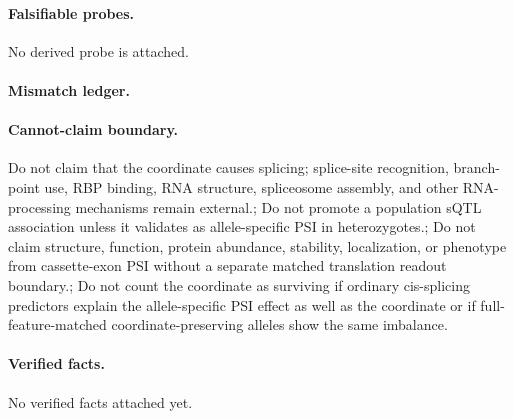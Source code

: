 \paragraph{Falsifiable probes.}
No derived probe is attached.

\paragraph{Mismatch ledger.}
\paragraph{Cannot-claim boundary.} Do not claim that the coordinate causes splicing; splice-site recognition, branch-point use, RBP binding, RNA structure, spliceosome assembly, and other RNA-processing mechanisms remain external.; Do not promote a population sQTL association unless it validates as allele-specific PSI in heterozygotes.; Do not claim structure, function, protein abundance, stability, localization, or phenotype from cassette-exon PSI without a separate matched translation readout boundary.; Do not count the coordinate as surviving if ordinary cis-splicing predictors explain the allele-specific PSI effect as well as the coordinate or if full-feature-matched coordinate-preserving alleles show the same imbalance.

\paragraph{Verified facts.}
No verified facts attached yet.
